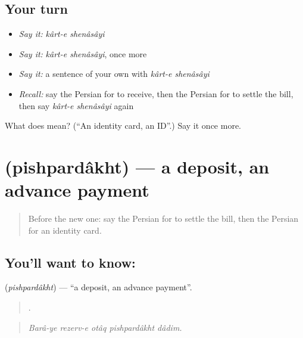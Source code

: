 \subsection*{Your turn}
\begin{itemize}
\raggedright
  \item \emph{Say it:} \emph{kârt-e shenâsâyi}
  \item \emph{Say it:} \emph{kârt-e shenâsâyi}, once more
  \item \emph{Say it:} a sentence of your own with \emph{kârt-e shenâsâyi}
  \item \emph{Recall:} say the Persian for to receive, then the Persian for to settle the bill, then say \emph{kârt-e shenâsâyi} again
\end{itemize}

\begin{tcolorbox}[breakable,colback=teal!4,colframe=teal!35!black,title={Before you move on}]
What does   mean? (\textquotedblleft{}An identity card, an ID\textquotedblright{}.) Say it once more.
\end{tcolorbox}
\section[\texorpdfstring{\fa{پیش} \fa{پرداخت} (pishpardâkht)}{پیش پرداخت (pishpardâkht)}]{  (pishpardâkht) — a deposit, an advance payment}

\label{lesson:FA-C438-pishpardakht}



\begin{quote}
Before the new one: say the Persian for to settle the bill, then the Persian for an identity card.
\end{quote}

\subsection*{You'll want to know:  }
\textbf{ } (\emph{pishpardâkht}) — \textquotedblleft{}a deposit, an advance payment\textquotedblright{}.

\begin{quote}
     .
\end{quote}

\begin{quote}
\emph{Barâ-ye rezerv-e otâq pishpardâkht dâdim.}
\end{quote}

